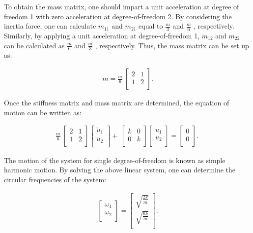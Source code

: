 \documentclass[paper=a4, fontsize=11pt]{scrartcl} %
\numberwithin{equation}{section} %
\numberwithin{figure}{section} %
\numberwithin{table}{section} %
\begin{document}
To obtain the mass matrix, one should impart a unit acceleration at
degree of freedom 1 with zero acceleration at degree-of-freedom 2. By
considering the inertia force, one can calculate $m_{11}$ and $m_{21}$
equal to $\frac{m}{3}$ and $\frac{m}{6}$ , respectively. Similarly, by
applying a unit acceleration at degree-of-freedom 1, $m_{12}$ and $m_{22}$
can be calculated as $\frac{m}{6}$ and $\frac{m}{3}$ , respectively. Thus,
the mass matrix can be set up as:

\begin{align}
  m=\frac{m}{6}\ \left[\begin{matrix}2&1\\1&2\\\end{matrix}\right].
\end{align}

Once the stiffness matrix and mass matrix are determined, the equation
of motion can be written as:

\begin{align}
\frac{m}{6}\
  \left[\begin{matrix}2&1\\1&2\\\end{matrix}\right]\left[\begin{matrix}{\ddot{u}}_1\\{\ddot{u}}_2\\\end{matrix}\right]+\
  \left[\begin{matrix}k&0\\0&k\\\end{matrix}\right]\left[\begin{matrix}u_1\\u_2\\\end{matrix}\right]=\left[\begin{matrix}0\\0\\\end{matrix}\right].\
\end{align}

The motion of the system for single degree-of-freedom is known as
simple harmonic motion. By solving the above linear system, one can
determine the circular frequencies of the system:

\begin{align}
  \begin{bmatrix}\omega_1\\\omega_2\\\end{bmatrix} =
  \begin{bmatrix} \sqrt{\frac{2k}{m}} \\ \sqrt{\frac{6k}{m}} \\ \end{bmatrix}.
\end{align}
\end{document}
